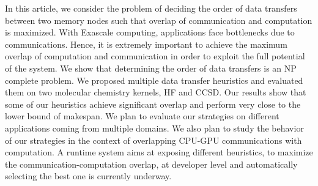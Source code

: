 \documentclass[runningheads]{llncs} %
\begin{document}
In this article, we consider the problem of deciding the order of data transfers between two memory nodes such that overlap of communication and  computation is maximized. With Exascale computing, applications face bottlenecks due to communications. Hence, it is extremely important to achieve the maximum overlap of computation and communication in order to exploit the full potential of the system. We show that determining the order of data transfers is an NP complete problem. We proposed multiple data transfer heuristics and evaluated them on two molecular chemistry kernels, HF and CCSD. Our results show that some of our heuristics achieve significant overlap and perform very close to the lower bound of makespan. We plan to evaluate our strategies on different applications coming from multiple domains. We also plan to study the behavior of our strategies in the context of overlapping CPU-GPU communications with computation. A runtime system aims at exposing different heuristics, to maximize the communication-computation overlap, at developer level and automatically selecting the best one is currently underway.






\end{document}
